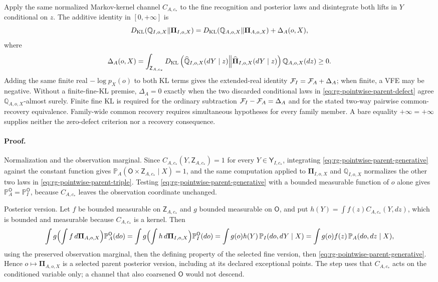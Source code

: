 Apply the same normalized Markov-kernel channel $C_{A,c_*}$ to the fine recognition and posterior laws and
disintegrate both lifts in
$Y$ conditional on $z$. The additive identity in $[0,+\infty]$ is
\begin{equation}
D_{\mathrm{KL}}(\mathbb Q_{I,o,X}\Vert\boldsymbol\Pi_{I,o,X})
=D_{\mathrm{KL}}(\mathbb Q_{A,o,X}\Vert\boldsymbol\Pi_{A,o,X})+\Delta_A(o,X),
\label{eq:rg-pointwise-parent-kl-chain}
\end{equation}
where
\begin{equation}
\Delta_A(o,X)=\int_{\mathsf Z_{A,c_*}}
D_{\mathrm{KL}}\left(
\widehat{\mathbb Q}_{I,o,X}(dY\mid z)
\middle\Vert
\widehat{\boldsymbol\Pi}_{I,o,X}(dY\mid z)
\right)\mathbb Q_{A,o,X}(dz)\geq0.
\label{eq:rg-pointwise-parent-defect}
\end{equation}
Adding the same finite real $-\log p_X(o)$ to both KL terms gives the extended-real identity
$\mathcal F_I=\mathcal F_A+\Delta_A$; when finite, a VFE may be negative. Without a finite-fine-KL
premise, $\Delta_A=0$ exactly when the two discarded conditional laws in
\eqref{eq:rg-pointwise-parent-defect} agree $\mathbb Q_{A,o,X}$-almost surely. Finite fine KL is
required for the ordinary subtraction $\mathcal F_I-\mathcal F_A=\Delta_A$ and for the stated two-way
pairwise common-recovery equivalence. Family-wide common recovery requires simultaneous hypotheses
for every family member. A bare equality $+\infty=+\infty$ supplies neither the zero-defect
criterion nor a recovery consequence. 

\paragraph{Proof.}
Normalization and the observation marginal.  Since
$C_{A,c_*}(Y,\mathsf Z_{A,c_*})=1$ for every
$Y\in\mathsf Y_{I,c_*}$, integrating \eqref{eq:rg-pointwise-parent-generative} against the constant
function gives $\mathbb P_A(\mathsf O\times\mathsf Z_{A,c_*}\mid X)=1$, and the same computation applied
to $\boldsymbol\Pi_{I,o,X}$ and $\mathbb Q_{I,o,X}$ normalizes the other two laws in
\eqref{eq:rg-pointwise-parent-triple}.  Testing
\eqref{eq:rg-pointwise-parent-generative} with a bounded measurable function of $o$ alone gives
$\mathbb P_A^{\mathsf O}=\mathbb P_I^{\mathsf O}$, because $C_{A,c_*}$ leaves the observation coordinate
unchanged.

Posterior version.  Let $f$ be bounded measurable on $\mathsf Z_{A,c_*}$ and $g$ bounded measurable on
$\mathsf O$, and put $h(Y)=\int f(z)C_{A,c_*}(Y,dz)$, which is bounded and measurable because
$C_{A,c_*}$ is a kernel.  Then
\[
\int g\Bigl(\int f\,d\boldsymbol\Pi_{A,o,X}\Bigr)\mathbb P_A^{\mathsf O}(do)
=\int g\Bigl(\int h\,d\boldsymbol\Pi_{I,o,X}\Bigr)\mathbb P_I^{\mathsf O}(do)
=\int g(o)h(Y)\,\mathbb P_I(do,dY\mid X)
=\int g(o)f(z)\,\mathbb P_A(do,dz\mid X),
\]
using the preserved observation marginal, then the defining property of the selected fine version,
then \eqref{eq:rg-pointwise-parent-generative}.  Hence $o\mapsto\boldsymbol\Pi_{A,o,X}$ is a selected
parent posterior version, including at its declared exceptional points.  The step uses that $C_{A,c_*}$
acts on the conditioned variable only; a channel that also coarsened $\mathsf O$ would not descend.

